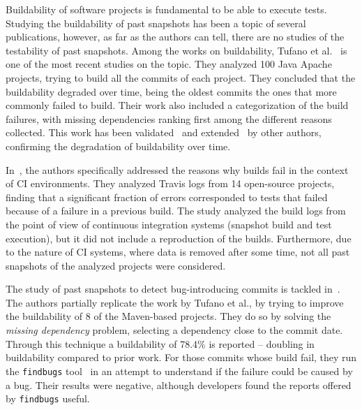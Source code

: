 
Buildability of software projects is fundamental to be able to execute tests. %
Studying the buildability of past snapshots has been a topic of several publications, however, as far as the authors can tell, there are no studies of the testability of past snapshots. 
Among the works on buildability, Tufano et al.~\cite{tufano2017there} is one of the most recent studies on the topic. 
They analyzed 100 Java Apache projects, trying to build all the commits of each project. 
They concluded that the buildability degraded over time, being the oldest commits the ones that more commonly failed to build. 
Their work also included a categorization of the build failures, with missing dependencies ranking first among the different reasons collected. 
This work has been validated~\cite{sulir2020large} and extended~\cite{maes2022revisiting} by other authors, confirming the degradation of buildability over time.

In~\cite{Rausch:2017:EAB:3104188.3104231}, the authors specifically addressed the reasons why builds fail in the context of CI environments. They analyzed Travis logs from 14 open-source projects, finding that a significant fraction of errors corresponded to tests that failed because of a failure in a previous build. The study analyzed the build logs from the point of view of continuous integration systems (snapshot build and test execution), but it did not include a reproduction of the builds. Furthermore, due to the nature of CI systems, where data is removed after some time, not all past snapshots of the analyzed projects were considered. 

The study of past snapshots to detect bug-introducing commits is tackled in~\cite{querel:2021:warning}. The authors partially replicate the work by Tufano et al., by trying to improve the buildability of 8 of the Maven-based projects. They do so by solving the \textit{missing dependency} problem, selecting a dependency close to the commit date. Through this technique a buildability of 78.4\% is reported -- doubling in buildability compared to prior work. For those commits whose build fail, they run the \texttt{findbugs} tool~\cite{ayewah2007using} in an attempt to understand if the failure could be caused by a bug. Their results were negative, although developers found the reports offered by \texttt{findbugs} useful.

